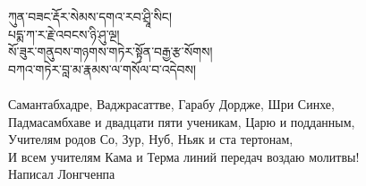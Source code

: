 
\ru


{\ti
ཀུན་བཟང་རྡོར་སེམས་དགའ་རབ་ཤྲཱི་སིང།\\
པདྨ་ཀ་ར་རྗེ་འབངས་ཉི་ཤུ་ལྔ།\\
སོ་ཟུར་གནུབས་གཉགས་གཏེར་སྟོན་བརྒྱ་རྩ་སོགས།\\
བཀའ་གཏེར་བླ་མ་རྣམས་ལ་གསོལ་བ་འདེབས།}\\
\\
\ru
Самантабхадре, Ваджрасаттве, Гарабу Дордже, Шри Синхе,\\
Падмасамбхаве и двадцати пяти ученикам, Царю и подданным,\\
Учителям родов Со, Зур, Нуб, Ньяк и ста тертонам,\\
И всем учителям Кама и Терма линий передач воздаю молитвы!\\
\scriptsize Написал Лонгченпа\normalsize\\
\\


